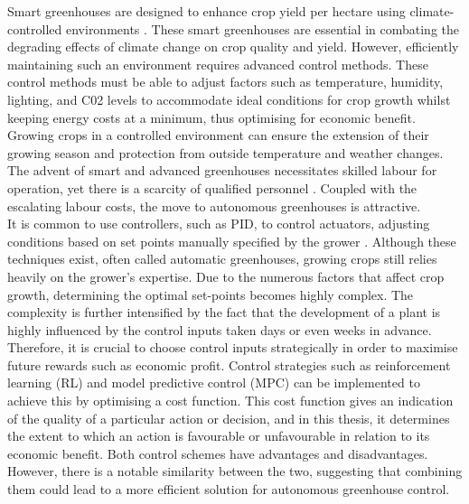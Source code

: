 Smart greenhouses are designed to enhance crop yield per hectare using climate-controlled environments \cite{morcegoReinforcementLearningModel2023}. These smart greenhouses are essential in combating the degrading effects of climate change on crop quality and yield. However, efficiently maintaining such an environment requires advanced control methods. These control methods must be able to adjust factors such as temperature, humidity, lighting, and C02 levels to accommodate ideal conditions for crop growth \cite{devopsGreenhouseClimateControl2021} whilst keeping energy costs at a minimum, thus optimising for economic benefit. Growing crops in a controlled environment can ensure the extension of their growing season and protection from outside temperature and weather changes. The advent of smart and advanced greenhouses necessitates skilled labour for operation, yet there is a scarcity of qualified personnel \cite{rusnakWhatCurrentState2018}. Coupled with the escalating labour costs, the move to autonomous greenhouses is attractive.\\


 It is common  to use controllers, such as PID, to control actuators, adjusting conditions based on set points manually specified by the grower \cite{zhangMethodologiesControlStrategies2020}. Although these techniques exist, often called automatic greenhouses, growing crops still relies heavily on the grower's expertise. Due to the numerous factors that affect crop growth, determining the optimal set-points becomes highly complex. The complexity is further intensified by the fact that the development of a plant is highly influenced by the control inputs taken days or even weeks in advance. Therefore, it is crucial to choose control inputs strategically in order to maximise future rewards such as economic profit. Control strategies such as reinforcement learning (RL) and model predictive control (MPC) can be implemented \cite{zhangMethodologiesControlStrategies2020} to achieve this by optimising a cost function. This cost function gives an indication of the quality of a particular action or decision, and in this thesis, it determines the extent to which an action is favourable or unfavourable in relation to its economic benefit. Both control schemes have advantages and disadvantages. However, there is a notable similarity between the two, suggesting that combining them could lead to a more efficient solution for autonomous greenhouse control.


